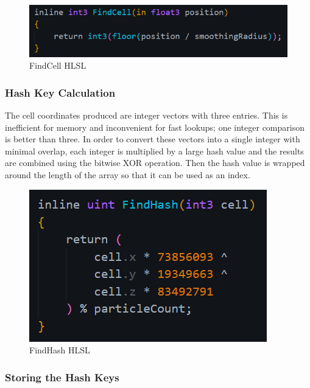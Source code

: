 \documentclass[a4paper, 12pt]{article}
\begin{document}
    \begin{figure}[H]
        \begin{center}
            \includegraphics[]{findCell.png}
            \caption{FindCell HLSL}
        \end{center}
    \end{figure}

    \subsubsection{Hash Key Calculation}

    The cell coordinates produced are integer vectors with three entries. This is inefficient for memory and inconvenient for fast lookups; one integer comparison is better than three. In order to convert these vectors into a single integer with minimal overlap, each integer is multiplied by a large hash value and the results are combined using the bitwise XOR operation. Then the hash value is wrapped around the length of the array so that it can be used as an index.

    \begin{figure}[H]
        \begin{center}
            \includegraphics[]{findHash.png}
            \caption{FindHash HLSL}
        \end{center}
    \end{figure}

    \subsubsection{Storing the Hash Keys}
\end{document}
